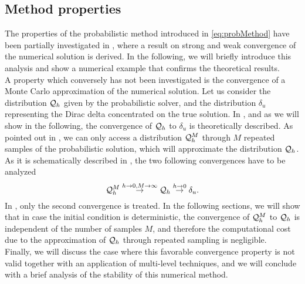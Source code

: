 \subsection{Method properties}
The properties of the probabilistic method introduced in \eqref{eq:probMethod} have been partially investigated in \cite{CGS16}, where a result on strong and weak convergence of the numerical solution is derived. In the following, we will briefly introduce this analysis and show a numerical example that confirms the theoretical results. \\
A property which conversely has not been investigated is the convergence of a Monte Carlo approximation of the numerical solution. Let us consider the distribution $\mathcal{Q}_h$ given by the probabilistic solver, and the distribution $\delta_u$ representing the Dirac delta concentrated on the true solution. In \cite{CGS16}, and as we will show in the following, the convergence of $\mathcal{Q}_h$ to $\delta_u$ is theoretically described. As pointed out in \cite{KeH16}, we can only access a distribution $\mathcal{Q}_h^M$ through $M$ repeated samples of the probabilistic solution, which will approximate the distribution $\mathcal{Q}_h$. As it is schematically described in \cite{KeH16}, the two following convergences have to be analyzed
\begin{equation}
	\mathcal{Q}_h^M \stackrel{h\to 0, M\to \infty}{\to} \mathcal{Q}_h \stackrel{h\to 0}{\to} \delta_u.
\end{equation}
In \cite{CGS16}, only the second convergence is treated. In the following sections, we will show that in case the initial condition is deterministic, the convergence of $\mathcal{Q}_h^M$ to $\mathcal{Q}_h$ is independent of the number of samples $M$, and therefore the computational cost due to the approximation of $\mathcal{Q}_h$ through repeated sampling is negligible. \\
Finally, we will discuss the case where this favorable convergence property is not valid together with an application of multi-level techniques, and we will conclude with a brief analysis of the stability of this numerical method. 











